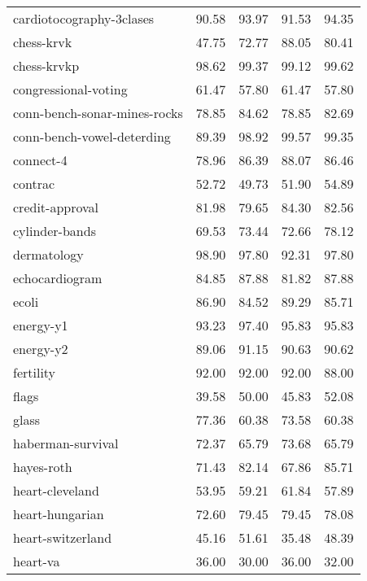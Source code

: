 \begin{longtable}{lrrrr}
      cardiotocography-3clases &   90.58 &    93.97 &  91.53 &  94.35 \\
                    chess-krvk &   47.75 &    72.77 &  88.05 &  80.41 \\
                   chess-krvkp &   98.62 &    99.37 &  99.12 &  99.62 \\
          congressional-voting &   61.47 &    57.80 &  61.47 &  57.80 \\
  conn-bench-sonar-mines-rocks &   78.85 &    84.62 &  78.85 &  82.69 \\
    conn-bench-vowel-deterding &   89.39 &    98.92 &  99.57 &  99.35 \\
                     connect-4 &   78.96 &    86.39 &  88.07 &  86.46 \\
                       contrac &   52.72 &    49.73 &  51.90 &  54.89 \\
               credit-approval &   81.98 &    79.65 &  84.30 &  82.56 \\
                cylinder-bands &   69.53 &    73.44 &  72.66 &  78.12 \\
                   dermatology &   98.90 &    97.80 &  92.31 &  97.80 \\
                echocardiogram &   84.85 &    87.88 &  81.82 &  87.88 \\
                         ecoli &   86.90 &    84.52 &  89.29 &  85.71 \\
                     energy-y1 &   93.23 &    97.40 &  95.83 &  95.83 \\
                     energy-y2 &   89.06 &    91.15 &  90.63 &  90.62 \\
                     fertility &   92.00 &    92.00 &  92.00 &  88.00 \\
                         flags &   39.58 &    50.00 &  45.83 &  52.08 \\
                         glass &   77.36 &    60.38 &  73.58 &  60.38 \\
             haberman-survival &   72.37 &    65.79 &  73.68 &  65.79 \\
                    hayes-roth &   71.43 &    82.14 &  67.86 &  85.71 \\
               heart-cleveland &   53.95 &    59.21 &  61.84 &  57.89 \\
               heart-hungarian &   72.60 &    79.45 &  79.45 &  78.08 \\
             heart-switzerland &   45.16 &    51.61 &  35.48 &  48.39 \\
                      heart-va &   36.00 &    30.00 &  36.00 &  32.00 \\

\end{longtable}
